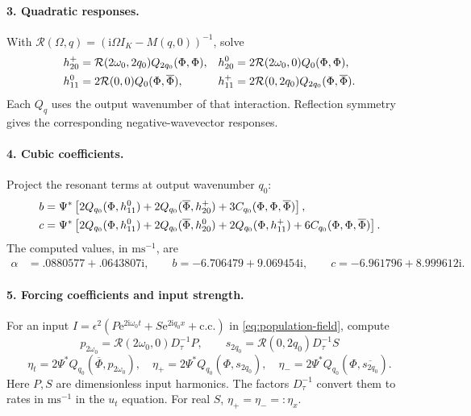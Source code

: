\documentclass[11pt]{article}
\newcommand{\ii}{\mathrm{i}}
\newcommand{\ee}{\mathrm{e}}
\newcommand{\cR}{\mathcal{R}}
\newcommand{\cc}{\mathrm{c.c.}}
\begin{document}
\paragraph{3. Quadratic responses.}
With $\cR(\Omega,q)=(\ii\Omega I_K-M(q,0))^{-1}$, solve
\begin{align}
 h_{20}^+&=\cR(2\omega_0,2q_0)Q_{2q_0}(\Phi,\Phi),&
 h_{20}^0&=2\cR(2\omega_0,0)Q_0(\Phi,\Phi),\notag\\
 h_{11}^0&=2\cR(0,0)Q_0(\Phi,\overline\Phi),&
 h_{11}^+&=2\cR(0,2q_0)Q_{2q_0}(\Phi,\overline\Phi).
 \label{eq:v1-quadratic-responses}
\end{align}
Each $Q_q$ uses the output wavenumber of that interaction.
Reflection symmetry gives the corresponding negative-wavevector responses.

\paragraph{4. Cubic coefficients.}
Project the resonant terms at output wavenumber $q_0$:
\begin{align}
 b={}&\Psi^*\left[2Q_{q_0}(\Phi,h_{11}^0)
       +2Q_{q_0}(\overline\Phi,h_{20}^+)
       +3C_{q_0}(\Phi,\Phi,\overline\Phi)\right],\notag\\
 c={}&\Psi^*\left[2Q_{q_0}(\Phi,h_{11}^0)
       +2Q_{q_0}(\overline\Phi,h_{20}^0)
       +2Q_{q_0}(\Phi,h_{11}^+)
       +6C_{q_0}(\Phi,\Phi,\overline\Phi)\right].
 \label{eq:v1-cubic-computation}
\end{align}
The computed values, in $\mathrm{ms}^{-1}$, are
\begin{equation}
 \begin{split}
 \alpha&=.0880577+.0643807\ii,\qquad 
 b=-6.706479+9.069454\ii,\qquad
 c=-6.961796+8.999612\ii.
 \end{split}
 \label{eq:v1-computed-coefficients}
\end{equation}

\paragraph{5. Forcing coefficients and input strength.}
For an input
$I=\epsilon^2(P\ee^{2\ii\omega_0t}+S\ee^{2\ii q_0x}+\cc)$
in \eqref{eq:population-field}, compute
\begin{equation}
      p_{2\omega_0}=\cR(2\omega_0,0)D_\tau^{-1}P,\qquad 
 s_{2q_0}=\cR(0,2q_0)D_\tau^{-1}S
\end{equation}
\begin{equation}
      \eta_t=2\Psi^*Q_{q_0}(\overline\Phi,p_{2\omega_0}),\quad
 \eta_+=2\Psi^*Q_{q_0}(\Phi,s_{2q_0}),\quad
 \eta_-=2\Psi^*Q_{q_0}(\Phi,\overline{s_{2q_0}}).
\end{equation}
Here $P,S$ are dimensionless input harmonics. The factors $D_\tau^{-1}$
convert them to rates in $\mathrm{ms}^{-1}$ in the $u_t$ equation.
For real $S$, $\eta_+=\eta_-=: \eta_x$. 
\end{document}
